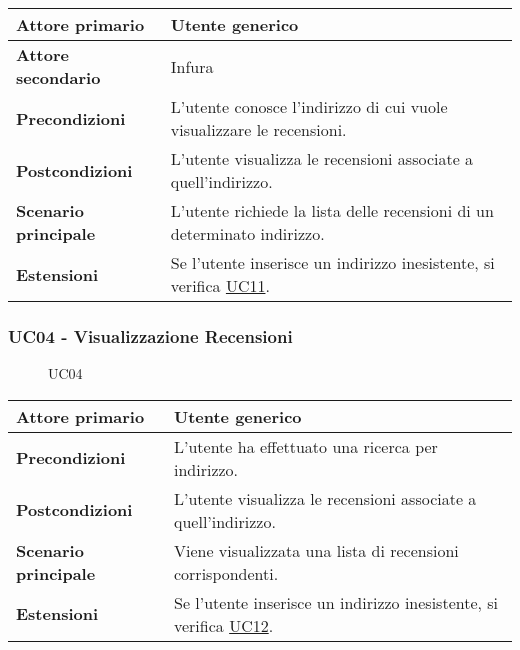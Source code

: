             \begin{center}
                \renewcommand{\arraystretch}{1.5}
                \begin{tabular}{m{10em} m{20em}}
                    \hline
                    \textbf{Attore primario} & Utente generico \\
                    \hline
                    \textbf{Attore secondario} & Infura \\
                    \hline
                    \textbf{Precondizioni} & L'utente conosce l'indirizzo di cui vuole visualizzare le recensioni. \\
                    \hline
                    \textbf{Postcondizioni} & L'utente visualizza le recensioni associate a quell'indirizzo. \\
                    \hline
                    \textbf{Scenario principale} & L'utente richiede la lista delle recensioni di un determinato indirizzo. \\
                    \hline
                    \textbf{Estensioni} & Se l'utente inserisce un indirizzo inesistente, si verifica \hyperref[UC11]{UC11}. \\
                    \hline
                \end{tabular}
            \end{center}

        \subsubsection{UC04 - Visualizzazione Recensioni}
        \label{UC04}

            \begin{figure}[H]
                \centering
                
                \caption{UC04}
            \end{figure}

            \begin{center}
                \renewcommand{\arraystretch}{1.5}
                \begin{tabular}{m{10em} m{20em}}
                    \hline
                    \textbf{Attore primario} & Utente generico \\
                    \hline
                    \textbf{Precondizioni} & L'utente ha effettuato una ricerca per indirizzo. \\
                    \hline
                    \textbf{Postcondizioni} & L'utente visualizza le recensioni associate a quell'indirizzo. \\
                    \hline
                    \textbf{Scenario principale} & Viene visualizzata una lista di recensioni corrispondenti. \\
                    \hline
                    \textbf{Estensioni} & Se l'utente inserisce un indirizzo inesistente, si verifica \hyperref[UC12]{UC12}. \\
                    \hline
                \end{tabular}
            \end{center}

